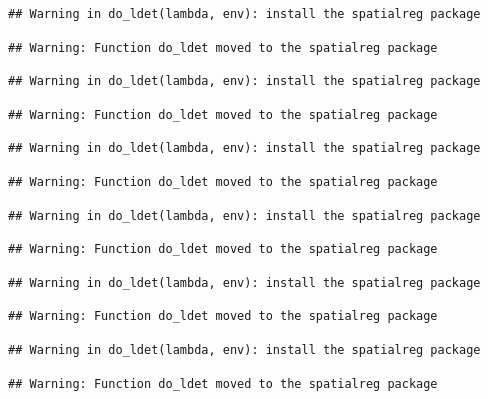 \documentclass[11pt,]{article}
\begin{document}
\begin{verbatim}
## Warning in do_ldet(lambda, env): install the spatialreg package
\end{verbatim}

\begin{verbatim}
## Warning: Function do_ldet moved to the spatialreg package
\end{verbatim}

\begin{verbatim}
## Warning in do_ldet(lambda, env): install the spatialreg package
\end{verbatim}

\begin{verbatim}
## Warning: Function do_ldet moved to the spatialreg package
\end{verbatim}

\begin{verbatim}
## Warning in do_ldet(lambda, env): install the spatialreg package
\end{verbatim}

\begin{verbatim}
## Warning: Function do_ldet moved to the spatialreg package
\end{verbatim}

\begin{verbatim}
## Warning in do_ldet(lambda, env): install the spatialreg package
\end{verbatim}

\begin{verbatim}
## Warning: Function do_ldet moved to the spatialreg package
\end{verbatim}

\begin{verbatim}
## Warning in do_ldet(lambda, env): install the spatialreg package
\end{verbatim}

\begin{verbatim}
## Warning: Function do_ldet moved to the spatialreg package
\end{verbatim}

\begin{verbatim}
## Warning in do_ldet(lambda, env): install the spatialreg package
\end{verbatim}

\begin{verbatim}
## Warning: Function do_ldet moved to the spatialreg package
\end{verbatim}
\end{document}
